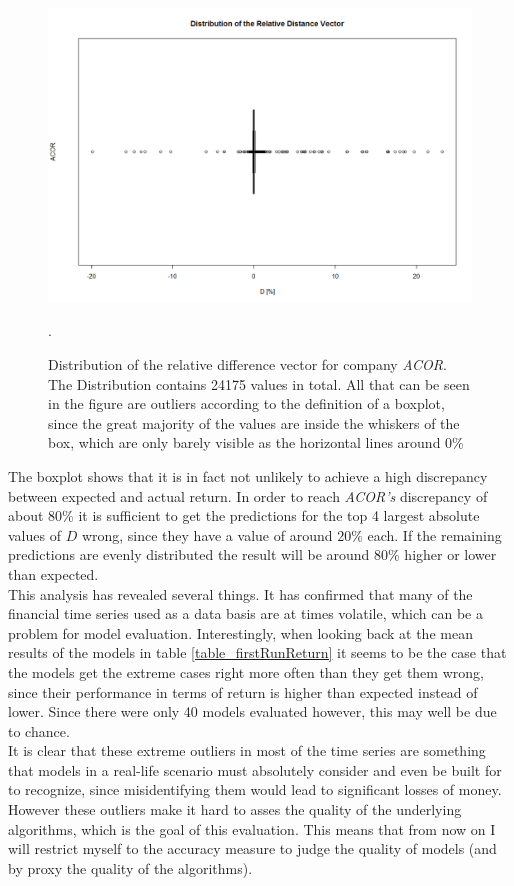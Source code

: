 \begin{figure}[h]
	\centering
  	\includegraphics[width=\textwidth]{acorDRDistribution}
	\caption[\textit{ACOR} Relative Difference Vector Distribution]{Distribution of the relative difference vector for company \textit{ACOR}. The Distribution contains 24175 values in total. All that can be seen in the figure are outliers according to the definition of a boxplot, since the great majority of the values are inside the whiskers of the box, which are only barely visible as the horizontal lines around 0\%}.
	\label{fig_acorDRDistribution}
\end{figure}

The boxplot shows that it is in fact not unlikely to achieve a high discrepancy between expected and actual return. In order to reach \textit{ACOR's} discrepancy of about $80\%$ it is sufficient to get the predictions for the top 4 largest absolute values of $D$ wrong, since they have a value of around $20\%$ each. If the remaining predictions are evenly distributed the result will be around $80\%$ higher or lower than expected. \\
This analysis has revealed several things. It has confirmed that many of the financial time series used as a data basis are at times volatile, which can be a problem for model evaluation. Interestingly, when looking back at the mean results of the models in table \ref{table_firstRunReturn} it seems to be the case that the models get the extreme cases right more often than they get them wrong, since their performance in terms of return is higher than expected instead of lower. Since there were only 40 models evaluated however, this may well be due to chance. \\
It is clear that these extreme outliers in most of the time series are something that models in a real-life scenario must absolutely consider and even be built for to recognize, since misidentifying them would lead to significant losses of money. However these outliers make it hard to asses the quality of the underlying algorithms, which is the goal of this evaluation. This means that from now on I will restrict myself to the accuracy measure to judge the quality of models (and by proxy the quality of the algorithms).

